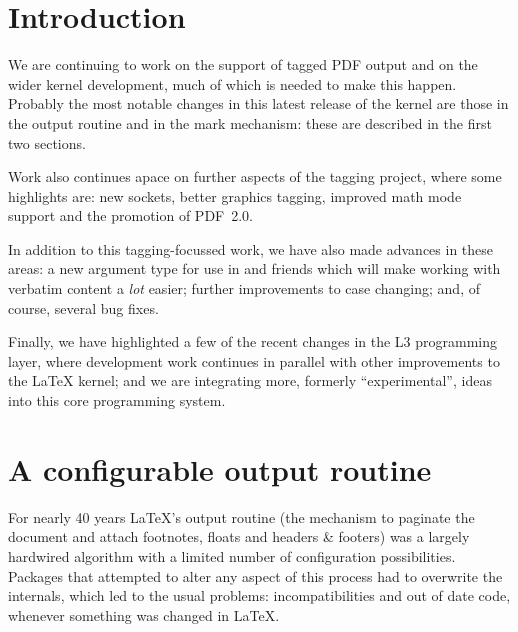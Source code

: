 \documentclass{ltnews}
\begin{document}
\maketitle
{  \spaceskip=3.33pt 
\tableofcontents}

\setlength{}

\medskip

\section{Introduction}

We are continuing to work on the support of tagged PDF output and on
the wider kernel development, much of which is needed to make this
happen.  Probably the most notable changes in this latest release of
the kernel are those in the output routine and in the mark mechanism:
these are described in the first two sections.

Work also continues apace on further aspects of the tagging project,
where some highlights are: new sockets, better graphics tagging,
improved math mode support and the promotion of PDF~2.0.

In addition to this tagging-focussed work, we have also made advances
in these areas: a new argument type for use in
 and friends which will make working with
verbatim content a \emph{lot} easier; further improvements to case
changing; and, of course, several bug fixes.

Finally, we have highlighted a few of the recent changes in the L3
programming layer, where development work continues in parallel with
other improvements to the \LaTeX{} kernel; and we are integrating
more, formerly \enquote{experimental}, ideas into this core
programming system.



\section{A configurable output routine}

For nearly 40 years \LaTeX's output routine (the mechanism to paginate
the document and attach footnotes, floats and headers \& footers) was
a largely hardwired algorithm with a limited number of configuration
possibilities.  Packages that attempted to alter any aspect of this
process had to overwrite the internals, which led to the usual
problems: incompatibilities and out of date code, whenever something
was changed in \LaTeX{}.
\end{document}
